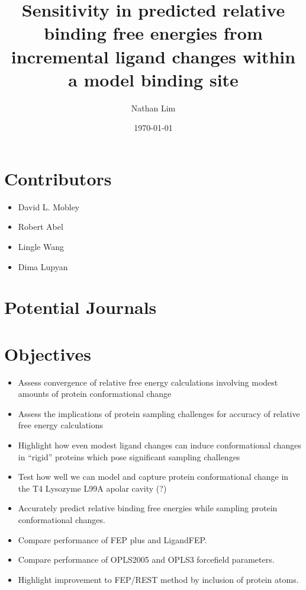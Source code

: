 \documentclass{article}
\begin{document}
\title{Sensitivity in predicted relative binding free energies from incremental ligand changes within a model binding site}
\date{\today}
\author{Nathan Lim}
\maketitle

\section*{Contributors}
\begin{itemize}
   \item David L. Mobley
   \item Robert Abel
   \item Lingle Wang
   \item Dima Lupyan
\end{itemize}

\section*{Potential Journals}

\section*{Objectives}
\begin{itemize}
   \item Assess convergence of relative free energy calculations involving modest amounts of protein conformational change
   \item Assess the implications of protein sampling challenges for accuracy of relative free energy calculations
   \item Highlight how even modest ligand changes can induce conformational changes in ``rigid'' proteins which pose significant sampling challenges
   \item  Test how well we can model and capture protein conformational change in the T4 Lysozyme L99A apolar cavity (?) %
   \item Accurately predict relative binding free energies while sampling protein conformational changes. %
   \item Compare performance of FEP plus \cite{FEPplus} and LigandFEP.
   \item Compare performance of OPLS2005 and OPLS3 forcefield parameters.
   \item Highlight improvement to FEP/REST \cite{REST2} method by inclusion of protein atoms.
\end{itemize}
\end{document}
